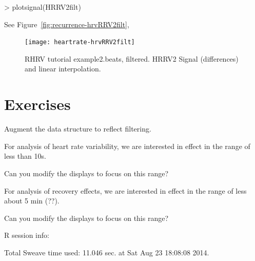 \documentclass[a4paper, english, utf8]{amsart}
\newcommand{\figref}[1]{Figure\ \vref{#1}}
\newcommand{\R}{{\normalfont\textsf{R}}{}}
\begin{document}
\begin{Schunk}
\begin{Sinput}
> plotsignal(HRRV2filt)
\end{Sinput}
\end{Schunk}
See \figref{fig:recurrence-hrvRRV2filt},

\begin{figure}[htbp]
\begin{center}
\texttt{[image: heartrate-hrvRRV2filt]}
\caption{RHRV tutorial example2.beats, filtered. HRRV2 Signal (differences) and linear interpolation.}
\label{fig:recurrence-hrvRRV2filt}
\end{center}
\end{figure}

\section{Exercises}
\begin{exca}
Augment the data structure to reflect filtering.
\end{exca}

\begin{exca}
For analysis of heart rate variability, we are interested in effect in the range of less than 10s.

Can you modify the displays to focus on this range?
\end{exca}

\begin{exca}
For analysis of recovery effects, we are interested in effect in the range of less about 5 min (??).

Can you modify the displays to focus on this range?
\end{exca}

\clearpage
\nocite{*}
%

%
\clearpage

\printindex

%

\clearpage
\R{} session info:

Total Sweave time used: 11.046 sec. at Sat Aug 23 18:08:08 2014.
\end{document}
